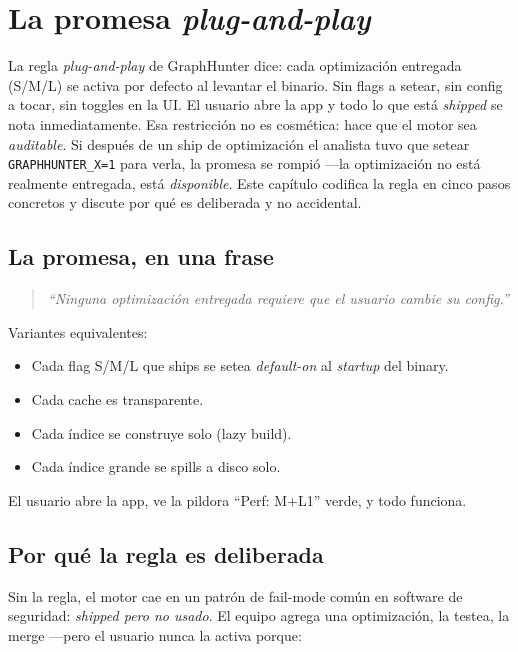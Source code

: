 \chapter{La promesa \emph{plug-and-play}}
\label{cap:plug-and-play}

\begin{intuicion}
La regla \emph{plug-and-play} de GraphHunter dice: cada
optimización entregada (S/M/L) se activa por defecto al levantar
el binario. Sin flags a setear, sin config a tocar, sin toggles en
la UI. El usuario abre la app y todo lo que está \emph{shipped}
se nota inmediatamente. Esa restricción no es cosmética: hace que
el motor sea \emph{auditable}. Si después de un ship de
optimización el analista tuvo que setear
\texttt{GRAPHHUNTER\_X=1} para verla, la promesa se rompió ---la
optimización no está realmente entregada, está \emph{disponible}.
Este capítulo codifica la regla en cinco pasos concretos y discute
por qué es deliberada y no accidental.
\end{intuicion}

\section{La promesa, en una frase}

\begin{quote}
\itshape
``Ninguna optimización entregada requiere que el usuario cambie su
config.''
\end{quote}

\noindent
Variantes equivalentes:

\begin{itemize}
    \item Cada flag S/M/L que ships se setea \emph{default-on} al
    \emph{startup} del binary.
    \item Cada cache es transparente.
    \item Cada índice se construye solo (lazy build).
    \item Cada índice grande se spills a disco solo.
\end{itemize}

\noindent
El usuario abre la app, ve la pildora ``Perf: M+L1'' verde, y todo
funciona.

\section{Por qué la regla es deliberada}

Sin la regla, el motor cae en un patrón de fail-mode común en
software de seguridad: \emph{shipped pero no usado}. El equipo
agrega una optimización, la testea, la merge ---pero el usuario
nunca la activa porque:

